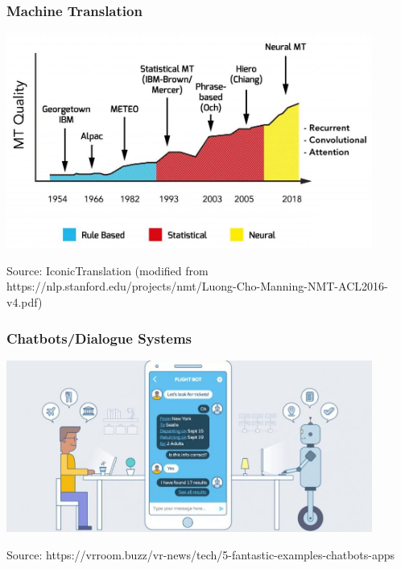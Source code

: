 \documentclass{beamer}
\begin{document}
\begin{frame}

	\frametitle{Machine Translation}

\centerline{\includegraphics[width=12cm]{./figs/history_MT.jpg}}
\tiny
Source: IconicTranslation
(modified from https://nlp.stanford.edu/projects/nmt/Luong-Cho-Manning-NMT-ACL2016-v4.pdf)
\end{frame}

\begin{frame}

	\frametitle{Chatbots/Dialogue Systems}

\centerline{\includegraphics[width=12cm]{./figs/chatbot.jpg}}
\tiny
Source: https://vrroom.buzz/vr-news/tech/5-fantastic-examples-chatbots-apps
\end{frame}
\end{document}
